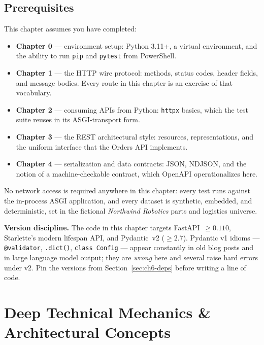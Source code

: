 \subsection*{Prerequisites}
This chapter assumes you have completed:

\begin{itemize}
  \item \textbf{Chapter 0} --- environment setup: Python 3.11+, a virtual
        environment, and the ability to run \texttt{pip} and \texttt{pytest}
        from PowerShell.
  \item \textbf{Chapter 1} --- the HTTP wire protocol: methods, status codes,
        header fields, and message bodies. Every route in this chapter is an
        exercise of that vocabulary.
  \item \textbf{Chapter 2} --- consuming APIs from Python: \texttt{httpx}
        basics, which the test suite reuses in its ASGI-transport form.
  \item \textbf{Chapter 3} --- the REST architectural style: resources,
        representations, and the uniform interface that the Orders API
        implements.
  \item \textbf{Chapter 4} --- serialization and data contracts: JSON, NDJSON,
        and the notion of a machine-checkable contract, which OpenAPI
        operationalizes here.
\end{itemize}

No network access is required anywhere in this chapter: every test runs
against the in-process ASGI application, and every dataset is synthetic,
embedded, and deterministic, set in the fictional \emph{Northwind Robotics}
parts and logistics universe.

\begin{warningbox}
\textbf{Version discipline.} The code in this chapter targets
FastAPI~$\geq0.110$, Starlette's modern lifespan API, and Pydantic~v2
($\geq2.7$). Pydantic v1 idioms --- \texttt{@validator}, \texttt{.dict()},
\texttt{class Config} --- appear constantly in old blog posts and in large
language model output; they are \emph{wrong} here and several raise hard
errors under v2. Pin the versions from Section~\ref{sec:ch6-deps} before
writing a line of code.
\end{warningbox}

\section{Deep Technical Mechanics \& Architectural Concepts}
\label{sec:ch6-mechanics}

